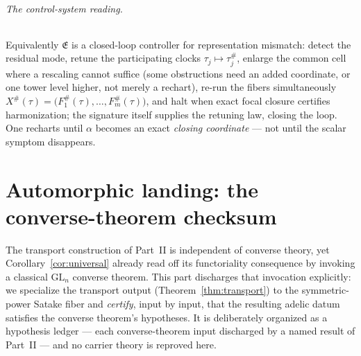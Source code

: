 \documentclass[11pt]{article}
\theoremstyle{definition}
\begin{document}
\paragraph{The control-system reading.} Equivalently $\mathfrak E$ is a closed-loop controller for representation
mismatch: detect the residual mode, retune the participating clocks $\tau_j\mapsto\tau_j^\#$, enlarge the common
cell where a rescaling cannot suffice (some obstructions need an added coordinate, or one tower level higher, not
merely a rechart), re-run the fibers simultaneously $X^\#(\tau)=\big(F_1^\#(\tau),\dots,F_m^\#(\tau)\big)$, and
halt when exact focal closure certifies harmonization; the signature itself supplies the retuning law, closing the
loop. One recharts until $\alpha$ becomes an exact \emph{closing coordinate} --- not until the scalar symptom
disappears.

\part{Automorphic landing: the converse-theorem checksum}

\noindent The transport construction of Part~II is independent of converse theory, yet
Corollary~\ref{cor:universal} already read off its functoriality consequence by invoking a classical
$\mathrm{GL}_n$ converse theorem. This part discharges that invocation explicitly: we specialize the transport
output (Theorem~\ref{thm:transport}) to the symmetric-power Satake fiber and \emph{certify}, input by input, that
the resulting adelic datum satisfies the converse theorem's hypotheses. It is deliberately organized as a
hypothesis ledger --- each converse-theorem input discharged by a named result of Part~II --- and no carrier
theory is reproved here.
\end{document}
